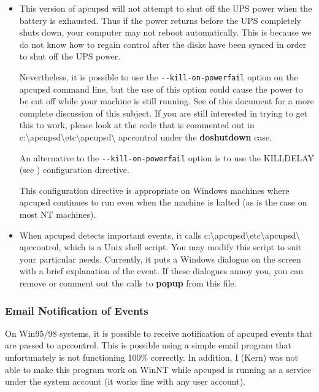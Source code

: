 {{{{{{{{{{\begin{itemize}
\item This version of apcupsd will not attempt to shut off the UPS power when
the battery is exhausted. Thus if the power returns before the UPS completely
shuts down, your computer may not reboot automatically. This is because we do
not know how to regain control after the disks have been synced in order to
shut off the UPS power.  

Nevertheless, it is possible to use the {\tt \verb{--{kill-on-powerfail} option on
the apcupsd command line, but the use of this option could cause the power to
be cut off while your machine is still running. See 
 of this
document for a more complete discussion of this subject. If you are still
interested in trying to get this to work, please look at the code that is
commented out in
c:\textbackslash{}apcupsd\textbackslash{}etc\textbackslash{}apcupsd\textbackslash
{}apccontrol under the {\bf doshutdown} case.  

An alternative to the {\tt \verb{--{kill-on-powerfail} option is to use the KILLDELAY
(see 
) configuration
directive.  

This configuration directive is appropriate on Windows machines where apcupsd
continues to run even when the machine is halted (as is the case on most NT
machines).  
\item When apcupsd detects important events, it calls
c:\textbackslash{}apcupsd\textbackslash{}etc\textbackslash{}apcupsd\textbackslash
{}apccontrol, which is a Unix shell script. You may modify this script to suit
your particular needs.  Currently, it puts a Windows dialogue on the screen
with a brief explanation of the event. If these dialogues annoy you, you can
remove or comment out the calls to {\bf popup} from this file. 
\end{itemize}

\label{Email-Notification-of-Events}

\subsubsection*{Email Notification of Events}

\label{index-Email-181}
\label{index-Notification_002c-Email-182}
On Win95/98 systems, it is possible to receive notification of apcupsd events
that are passed to apccontrol. This is possible using a simple email program
that unfortunately is not functioning 100\% correctly. In addition, I (Kern)
was not able to make this program work on WinNT while apcupsd is running as a
service under the system account (it works fine with any user account).  

}}}}}}}}}}

